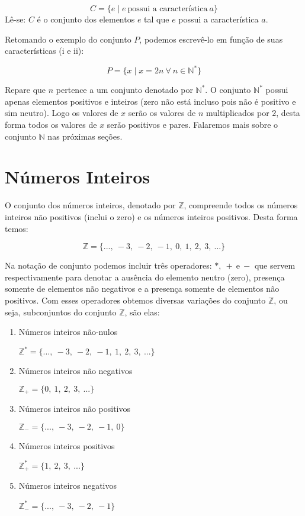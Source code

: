 \documentclass[]{book}
\begin{document}
\[C = \{ e \mid e \ \text{possui a característica} \ a\}\] Lê-se: \(C\)
é o conjunto dos elementos \(e\) tal que \(e\) possui a característica
\(a\).

Retomando o exemplo do conjunto \(P\), podemos escrevê-lo em função de
suas características (i e ii):

\[P = \{x \mid x = 2n \ \forall \ n \in \mathbb{N}^{*} \}\]

Repare que \(n\) pertence a um conjunto denotado por \(\mathbb{N}^{*}\).
O conjunto \(\mathbb{N}^{*}\) possui apenas elementos positivos e
inteiros (zero não está incluso pois não é positivo e sim neutro). Logo
os valores de \(x\) serão os valores de \(n\) multiplicados por \(2\),
desta forma todos os valores de \(x\) serão positivos e pares. Falaremos
mais sobre o conjunto \(\mathbb{N}\) nas próximas seções.

\section{Números Inteiros}\label{numeros-inteiros}

O conjunto dos números inteiros, denotado por \(\mathbb{Z}\), compreende
todos os números inteiros não positivos (inclui o zero) e os números
inteiros positivos. Desta forma temos:

\[\mathbb{Z} = \{ ...,\ -3,\ -2,\ -1,\ 0,\ 1,\ 2,\ 3,\ ... \}\]

Na notação de conjunto podemos incluir três operadores:
\(*,\ + \ \text{e} \ -\) que servem respectivamente para denotar a
ausência do elemento neutro (zero), presença somente de elementos não
negativos e a presença somente de elementos não positivos. Com esses
operadores obtemos diversas variações do conjunto \(\mathbb{Z}\), ou
seja, subconjuntos do conjunto \(\mathbb{Z}\), são elas:

\begin{enumerate}
\def\labelenumi{\arabic{enumi}.}
\item
  Números inteiros não-nulos

  \(\mathbb{Z}^{*} = \{...,\ -3,\ -2,\ -1,\ 1,\ 2,\ 3,\ ... \}\)
\item
  Números inteiros não negativos

  \(\mathbb{Z}_{+} = \{0,\ 1,\ 2,\ 3,\ ... \}\)
\item
  Números inteiros não positivos

  \(\mathbb{Z}_{-} = \{...,\ -3,\ -2,\ -1,\ 0 \}\)
\item
  Números inteiros positivos

  \(\mathbb{Z}_{+}^{*} = \{ 1,\ 2,\ 3,\ ... \}\)
\item
  Números inteiros negativos

  \(\mathbb{Z}_{-}^{*} = \{...,\ -3,\ -2,\ -1 \}\)
\end{enumerate}
\end{document}

